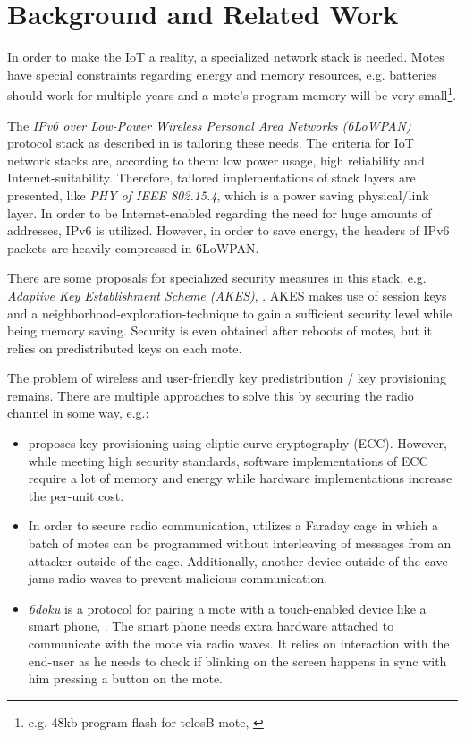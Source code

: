 \documentclass{sig-alternate} %
\begin{document}
\section{Background and Related Work}
\label{sec:related_work}

In order to make the IoT a reality, a specialized network stack is needed.
Motes have special constraints regarding energy and memory resources, e.g. batteries should work for multiple years and a mote's program memory will be very small\footnote{e.g. 48kb program flash for telosB mote, \cite{telosb}}.

The \textit{IPv6 over Low-Power Wireless Personal Area Networks (6LoWPAN)} protocol stack as described in \cite{palattella2013standardized} is tailoring these needs.
The criteria for IoT network stacks are, according to them: low power usage, high reliability and Internet-suitability.
Therefore, tailored implementations of stack layers are presented, like \textit{PHY of IEEE 802.15.4}, which is a power saving physical/link layer.
In order to be Internet-enabled regarding the need for huge amounts of addresses, IPv6 is utilized.
However, in order to save energy, the headers of IPv6 packets are heavily compressed in 6LoWPAN.

There are some proposals for specialized security measures in this stack, e.g. \textit{Adaptive Key Establishment Scheme (AKES)}, \cite{krentz15akes}.
AKES makes use of session keys and a neighborhood-exploration-technique to gain a sufficient security level while being memory saving.
Security is even obtained after reboots of motes, but it relies on predistributed keys on each mote.

The problem of wireless and user-friendly key predistribution / key provisioning remains.
There are multiple approaches to solve this by securing the radio channel in some way, e.g.:

\begin{itemize}
	\item \cite{chen2011over} proposes key provisioning using eliptic curve cryptography (ECC). However, while meeting high security standards, software implementations of ECC require a lot of memory and energy while hardware implementations increase the per-unit cost.
	\item In order to secure radio communication, \cite{kuo2007message} utilizes a Faraday cage in which a batch of motes can be programmed without interleaving of messages from an attacker outside of the cage. Additionally, another device outside of the cave jams radio waves to prevent malicious communication.
	\item \textit{6doku} is a protocol for pairing  a mote with a touch-enabled device like a smart phone, \cite{krentz20156doku}. The smart phone needs extra hardware attached to communicate with the mote via radio waves. It relies on interaction with the end-user as he needs to check if blinking on the screen happens in sync with him pressing a button on the mote.
\end{itemize}
\end{document}
